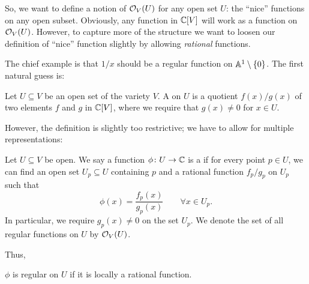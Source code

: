 So, we want to define a notion of $\mathcal O_V(U)$ for any open set $U$:
the ``nice'' functions on any open subset.
Obviously, any function in $\mathbb C[V]$ will work as a function on $\mathcal O_V(U)$.
However, to capture more of the structure we want to
loosen our definition of ``nice'' function slightly
by allowing \emph{rational} functions.

The chief example is that $1/x$ should be a regular function
on $\mathbb A^1 \setminus \{0\}$.
The first natural guess is:
\begin{definition}
	Let $U \subseteq V$ be an open set of the variety $V$.
	A  on $U$
	is a quotient $f(x) / g(x)$ of two elements $f$ and $g$ in $\mathbb C[V]$,
	where we require that $g(x) \neq 0$ for $x \in U$.
\end{definition}
However, the definition is slightly too restrictive;
we have to allow for multiple representations:
\begin{definition}
	Let $U \subseteq V$ be open.
	We say a function $\phi \colon U \to \mathbb C$ is a  if for
	every point $p \in U$, we can find an open set $U_p \subseteq U$ containing $p$
	and a rational function $f_p/g_p$ on $U_p$ such that
	\[ \phi(x) = \frac{f_p(x)}{g_p(x)} \qquad \forall x \in U_p. \]
	In particular, we require $g_p(x) \neq 0$ on the set $U_p$.
	We denote the set of all regular functions on $U$ by $\mathcal O_V(U)$.
\end{definition}

Thus,
\begin{moral}
	$\phi$ is regular on $U$ if it is locally a rational function.
\end{moral}

